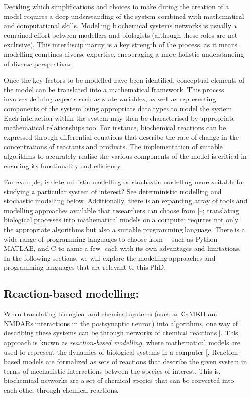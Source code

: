 \documentclass[
  11pt,
  letterpaper,
]{scrreprt}
\begin{document}
Deciding which simplifications and choices to make during the creation
of a model requires a deep understanding of the system combined with
mathematical and computational skills. Modelling biochemical systems
networks is usually a combined effort between modellers and biologists
(although these roles are not exclusive). This interdisciplinarity is a
key strength of the process, as it means modelling combines diverse
expertise, encouraging a more holistic understanding of diverse
perspectives.

Once the key factors to be modelled have been identified, conceptual
elements of the model can be translated into a mathematical framework.
This process involves defining aspects such as state variables, as well
as representing components of the system using appropriate data types to
model the system. Each interaction within the system may then be
characterised by appropriate mathematical relationships too. For
instance, biochemical reactions can be expressed through differential
equations that describe the rate of change in the concentrations of
reactants and products. The implementation of suitable algorithms to
accurately realise the various components of the model is critical in
ensuring its functionality and efficiency.

For example, is deterministic modelling or stochastic modelling more
suitable for studying a particular system of interest? See deterministic
modelling and stochastic modelling below. Additionally, there is an
expanding array of tools and modelling approaches available that
researchers can choose from
{[}--\citeproc{ref-kohl2011Standards}{265}{]};
translating biological processes into mathematical models on a computer
requires not only the appropriate algorithms but also a suitable
programming language. There is a wide range of programming languages to
choose from ---such as Python, MATLAB, and C to name a few- each with
its own advantages and limitations. In the following sections, we will
explore the modelling approaches and programming languages that are
relevant to this PhD.

\subsection*{Reaction-based modelling:}\label{reaction-based-modelling}

When translating biological and chemical systems (such as CaMKII and
NMDARs interactions in the postsynaptic neuron) into algorithms, one way
of describing these systems can be through networks of chemical
reactions {[}\citeproc{ref-cook2009Programmability}{266}{]}. This
approach is known as \emph{reaction-based modelling}, where mathematical
models are used to represent the dynamics of biological systems in a
computer {[}\citeproc{ref-besozzi2016ReactionBased}{267}{]}.
Reaction-based models are formalized as sets of reactions that describe
the given system in terms of mechanistic interactions between the
species of interest. This is, biochemical networks are a set of chemical
species that can be converted into each other through chemical
reactions.
\end{document}
